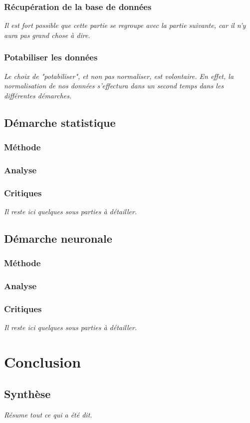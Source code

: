 \documentclass[12pt, letterpaper, french]{report}
\begin{document}
\subsection{Récupération de la base de données}
\textit{Il est fort possible que cette partie se regroupe avec la partie suivante, car il n'y aura pas grand chose à dire.}
\subsection{Potabiliser les données}
\textit{Le choix de "potabiliser", et non pas normaliser, est volontaire. En effet, la normalisation de nos données s'effectura dans un second temps dans les différentes démarches.}
\section{Démarche statistique}
\subsection{Méthode}
\subsection{Analyse}
\subsection{Critiques}
\textit{Il reste ici quelques sous parties à détailler.}
\section{Démarche neuronale}
\subsection{Méthode}
\subsection{Analyse}
\subsection{Critiques}
\textit{Il reste ici quelques sous parties à détailler.}

\chapter{Conclusion}
\section{Synthèse}
\textit{Résume tout ce qui a été dit.}
\end{document}
